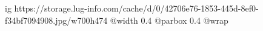  
 
 
 
 

\ifcmt
  ig https://storage.lug-info.com/cache/d/0/42706e76-1853-445d-8ef0-f34bf7094908.jpg/w700h474
  @width 0.4
  @parbox 0.4
  @wrap \parpic[r]
\fi

